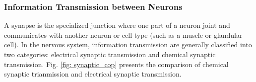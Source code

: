 \documentclass[journal,comsoc]{IEEEtran}
\begin{document}
			\subsubsection{Information Transmission between Neurons}
				A synapse is the specialized junction where one part of a neuron joint and communicates with another neuron or cell type (such as a muscle or glandular cell). 
				In the nervous system, information transmission are generally classified into two categories: electrical synaptic transmission and chemical synaptic transmission.
				Fig. \ref{fig: synaptic_cop} presents the comparison of chemical synaptic trianmission and electrical synaptic transmission.
				\begin{figure}[htbp]
					\centering
\end{figure}
\end{document}
